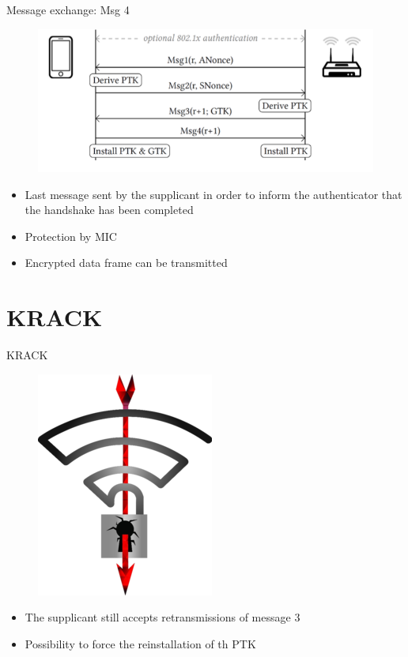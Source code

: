 \documentclass[11pt,t]{beamer}
\begin{document}
 
 \begin{frame}[fragile]{Message exchange: Msg 4}  
	
	\begin{figure}[tbh]
		\centering
		\includegraphics[width=0.8\linewidth]{graphics/4wh/phase4.png}
		\label{fig:phase4}
	  \end{figure}

	  \begin{itemize}
		\item Last message sent by the supplicant in order to inform the authenticator that the handshake has been completed
		\item Protection by MIC
		\item Encrypted data frame can be transmitted
	\end{itemize}

 \sed
 \end{frame}


\section{KRACK}
\begin{frame}[fragile]{KRACK \tiny\cite{krk}}  
	
	\begin{figure}[tbh]
		\centering
		\includegraphics[width=0.3\linewidth]{graphics/krack/kracklogo.png}
		\label{fig:kracklogo}
	  \end{figure}

	\begin{itemize}
		\item The supplicant still accepts retransmissions of message 3
		\item Possibility to force the reinstallation of th PTK 
	\end{itemize}

\sed
\end{frame}
\end{document}
